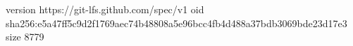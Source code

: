 version https://git-lfs.github.com/spec/v1
oid sha256:e5a47ff5c9d2f1769aec74b48808a5e96bcc4fb4d488a37bdb3069bde23d17e3
size 8779
